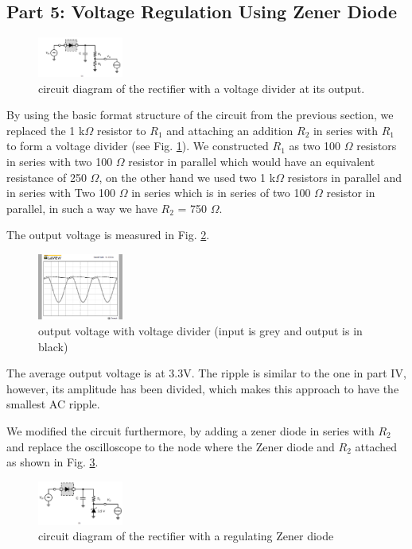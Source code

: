\documentclass[letterpaper, 10 pt, conference]{ieeeconf}  %
\begin{document}
\subsection{Part 5: Voltage Regulation Using Zener Diode}
\begin{figure}[!hb]
  \centering
  \includegraphics[width=0.25\textwidth]{images/5_1.png}
  \caption{circuit diagram of the rectifier with a voltage divider at its output.}
  \label{fig:5.1}
\end{figure}
By using the basic format structure of the circuit from the previous section,
we replaced the 1 k$\Omega$ resistor to $R_{1}$ and attaching an addition
$R_{2}$ in series with $R_{1}$ to form a voltage divider (see Fig. \ref{fig:5.1}).
We constructed $R_{1}$ as two 100 $\Omega$ resistors in series with two 100
$\Omega$ resistor in parallel which would have an equivalent resistance of
250 $\Omega$, on the other hand we used two 1 k$\Omega$ resistors in parallel
and in series with Two 100 $\Omega$ in series which is in series of two 100
$\Omega$ resistor in parallel, in such a way we have $R_{2}$ = 750 $\Omega$.
\par The output voltage is measured in Fig. \ref{fig:5.2}.
\begin{figure}[!hb]
  \centering
  \includegraphics[width=0.25\textwidth]{images/5_2.png}
  \caption{output voltage with voltage divider (input is grey and output is in black)}
  \label{fig:5.2}
\end{figure}
\par The average output voltage is at 3.3V.
The ripple is similar to the one in part IV, however, its amplitude has been divided,
which makes this approach to have the smallest AC ripple.
\par We modified the circuit furthermore, by adding a zener diode in
series with $R_{2}$ and replace the oscilloscope to the node where the Zener diode
and $R_{2}$ attached as shown in Fig. \ref{fig:5.3}.
\begin{figure}[!hb]
  \centering
  \includegraphics[width=0.25\textwidth]{images/5_3.png}
  \caption{circuit diagram of the rectifier with a regulating Zener diode}
  \label{fig:5.3}
\end{figure}
\end{document}
